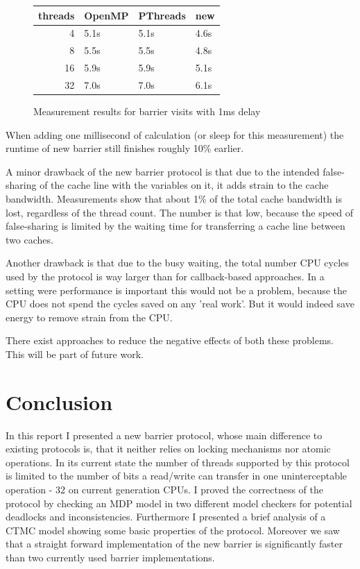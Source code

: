 \documentclass[a4paper, 10pt]{article}
\begin{document}
\begin{figure}[htbp]
	\centering
	\begin{tabular}{r | l l l}
		threads & OpenMP & PThreads & new \\
		\hline
		 4      & 5.1s   & 5.1s     & 4.6s \\
		 8      & 5.5s   & 5.5s     & 4.8s \\
		16      & 5.9s   & 5.9s     & 5.1s \\
		32      & 7.0s   & 7.0s     & 6.1s \\
	\end{tabular}
	\caption{Measurement results for barrier visits with 1ms delay}
	\label{fig:measurement-2}
\end{figure}

When adding one millisecond of calculation (or sleep for this measurement) the runtime of new barrier still finishes roughly 10\% earlier.

A minor drawback of the new barrier protocol is that due to the intended false-sharing of the cache line with the variables on it, it adds strain to the cache bandwidth. Measurements show that about 1\% of the total cache bandwidth is lost, regardless of the thread count. The number is that low, because the speed of false-sharing is limited by the waiting time for transferring a cache line between two caches.

Another drawback is that due to the busy waiting, the total number CPU cycles used by the protocol is way larger than for callback-based approaches. In a setting were performance is important this would not be a problem, because the CPU does not spend the cycles saved on any 'real work'. But it would indeed save energy to remove strain from the CPU.

There exist approaches to reduce the negative effects of both these problems. This will be part of future work.

\section{Conclusion}
In this report I presented a new barrier protocol, whose main difference to existing protocols is, that it neither relies on locking mechanisms nor atomic operations.
In its current state the number of threads supported by this protocol is limited to the number of bits a read/write can transfer in one uninterceptable operation - 32 on current generation CPUs.
I proved the correctness of the protocol by checking an MDP model in two different model checkers for potential deadlocks and inconsistencies.
Furthermore I presented a brief analysis of a CTMC model showing some basic properties of the protocol.
Moreover we saw that a straight forward implementation of the new barrier is significantly faster than two currently used barrier implementations.
\end{document}
